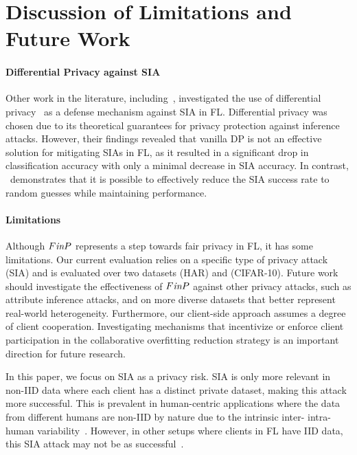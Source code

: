 \section{Discussion of Limitations and Future Work}

\paragraph{\textbf{Differential Privacy against SIA}}
Other work in the literature, including~\cite{BG_SIA_2}, investigated the use of differential privacy~\cite{dwork2006calibrating} as a defense mechanism against SIA in FL. Differential privacy was chosen due to its theoretical guarantees for privacy protection against inference attacks. However, their findings revealed that vanilla DP is not an effective solution for mitigating SIAs in FL, as it resulted in a significant drop in classification accuracy with only a minimal decrease in SIA accuracy. In contrast, \sysname\ demonstrates that it is possible to effectively reduce the SIA success rate to random guesses while maintaining performance. 




\paragraph{\textbf{Limitations}} Although $F\emph{in}P$ represents a step towards fair privacy in FL, it has some limitations. Our current evaluation relies on a specific type of privacy attack (SIA) and is evaluated over two datasets (HAR) and (CIFAR-10). Future work should investigate the effectiveness of $F\emph{in}P$ against other privacy attacks, such as attribute inference attacks, and on more diverse datasets that better represent real-world heterogeneity. Furthermore, our client-side approach assumes a degree of client cooperation. Investigating mechanisms that incentivize or enforce client participation in the collaborative overfitting reduction strategy is an important direction for future research.

In this paper, we focus on SIA as a privacy risk. SIA is only more relevant in non-IID data where each client has a distinct private dataset, making this attack more successful. This is prevalent in human-centric applications where the data from different humans are non-IID by nature due to the intrinsic inter- intra-human variability~\cite{zhao2024fina}. However, in other setups where clients in FL have IID data, this SIA attack may not be as successful~\cite{BG_SIA_2}.

